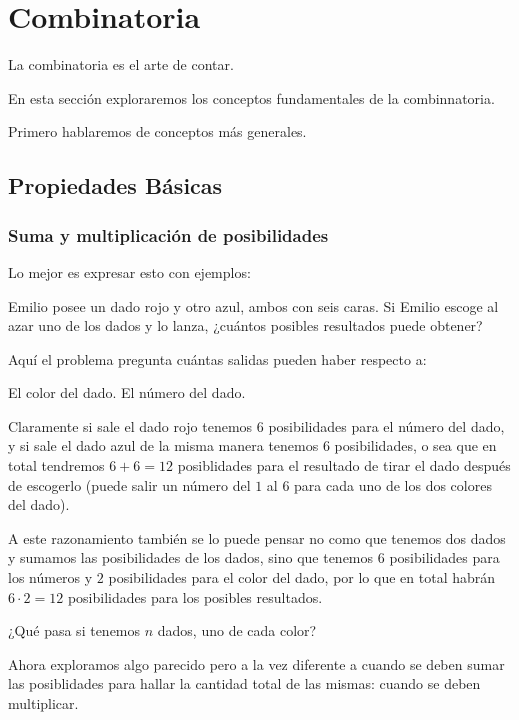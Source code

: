 \chapter{Combinatoria}
La combinatoria es el arte de contar.

En esta sección exploraremos los conceptos
fundamentales de la combinnatoria.

Primero hablaremos de conceptos más
generales.

\section{Propiedades Básicas}

\subsection{Suma y multiplicación de posibilidades}
Lo mejor es expresar esto con ejemplos:
\begin{example}
	Emilio posee un dado rojo y otro azul,
	ambos con seis caras. Si Emilio
	escoge al azar uno de los dados y lo
	lanza, ¿cuántos posibles resultados
	puede obtener?
\end{example}

Aquí el problema pregunta cuántas
salidas pueden haber respecto a:
\begin{itemize}
	\ii El color del dado.
	\ii El número del dado.
\end{itemize}

Claramente si sale el dado rojo
tenemos $6$ posibilidades para
el número del dado,
y si sale el dado azul de la misma manera
tenemos $6$ posibilidades, o sea que
en total tendremos $6 + 6 = 12$ posiblidades
para el resultado de tirar el dado
después de escogerlo (puede salir
un número del $1$ al $6$ para
cada uno de los dos colores del dado).

A este razonamiento también se lo
puede pensar no como que tenemos
dos dados y sumamos
las posibilidades de los dados,
sino que tenemos $6$ posibilidades
para los números y $2$ posibilidades para
el color del dado, por lo que
en total habrán $6 \cdot 2 = 12$
posibilidades para los posibles resultados.

\begin{question*}
	¿Qué pasa si tenemos $n$ dados,
	uno de cada color?
\end{question*}

Ahora exploramos algo parecido
pero a la vez diferente a cuando
se deben sumar las posiblidades para
hallar la cantidad total de las mismas:
cuando se deben multiplicar.

